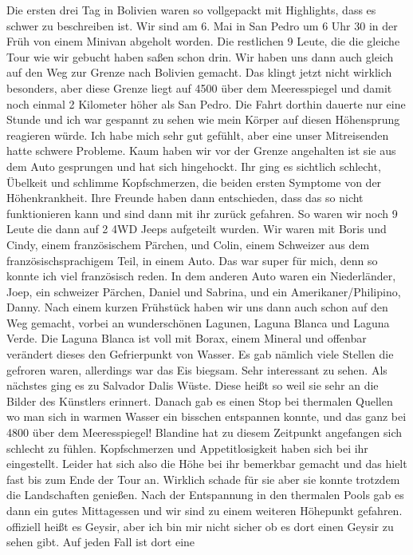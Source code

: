 \documentclass[11pt]{book}
\begin{document}
Die ersten drei Tag in Bolivien waren so vollgepackt mit Highlights, dass es schwer zu beschreiben ist. Wir sind am 6. Mai in San Pedro um 6 Uhr 30 
in der Früh von einem Minivan abgeholt worden. Die restlichen 9 Leute, die die gleiche Tour wie wir gebucht haben saßen schon drin. Wir haben uns 
dann auch gleich auf den Weg zur Grenze nach Bolivien gemacht. Das klingt jetzt nicht wirklich besonders, aber diese Grenze liegt auf 4500 über dem 
Meeresspiegel und damit noch einmal 2 Kilometer höher als San Pedro. Die Fahrt dorthin dauerte nur eine Stunde und ich war gespannt zu sehen wie mein 
Körper auf diesen Höhensprung reagieren würde. Ich habe mich sehr gut gefühlt, aber eine unser Mitreisenden hatte schwere Probleme. Kaum haben wir vor 
der Grenze angehalten ist sie aus dem Auto gesprungen und hat sich hingehockt. Ihr ging es sichtlich schlecht, Übelkeit und schlimme Kopfschmerzen, die 
beiden ersten Symptome von der Höhenkrankheit. Ihre Freunde haben dann entschieden, dass das so nicht funktionieren kann und sind dann mit ihr zurück 
gefahren. So waren wir noch 9 Leute die dann auf 2 4WD Jeeps aufgeteilt wurden. Wir waren mit Boris und Cindy, einem französischem Pärchen, und Colin, 
einem Schweizer aus dem französischsprachigem Teil, in einem Auto. Das war super für mich, denn so konnte ich viel französisch reden. In dem anderen 
Auto waren ein Niederländer, Joep, ein schweizer Pärchen, Daniel und Sabrina, und ein Amerikaner/Philipino, Danny. Nach einem kurzen Frühstück haben 
wir uns dann auch schon auf den Weg gemacht, vorbei an wunderschönen Lagunen, Laguna Blanca und Laguna Verde. Die Laguna Blanca ist voll mit Borax, 
einem Mineral und offenbar verändert dieses den Gefrierpunkt von Wasser. Es gab nämlich viele Stellen die gefroren waren, allerdings war das Eis 
biegsam. Sehr interessant zu sehen. Als nächstes ging es zu Salvador Dalis Wüste. Diese heißt so weil sie sehr an die Bilder des Künstlers erinnert. 
Danach gab es einen Stop bei thermalen Quellen wo man sich in warmen Wasser ein bisschen entspannen konnte, und das 
ganz bei 4800 über dem Meeresspiegel! Blandine hat zu diesem Zeitpunkt angefangen sich schlecht zu fühlen. Kopfschmerzen und Appetitlosigkeit haben 
sich bei ihr eingestellt. Leider hat sich also die Höhe bei ihr bemerkbar gemacht und das hielt fast bis zum Ende der Tour an. Wirklich schade für sie 
aber sie konnte trotzdem die Landschaften genießen. Nach der Entspannung in den thermalen Pools gab es dann ein gutes Mittagessen und wir sind zu einem 
weiteren Höhepunkt gefahren. offiziell heißt es Geysir, aber ich bin mir nicht sicher ob es dort einen Geysir zu sehen gibt. Auf jeden Fall ist dort eine 
\end{document}
